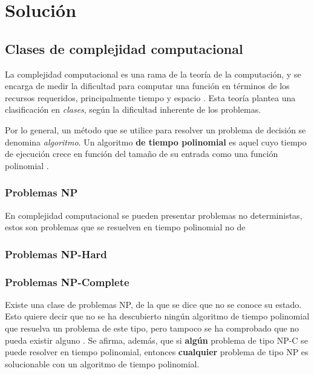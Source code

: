 \section{Solución}

\subsection{Clases de complejidad computacional}

La complejidad computacional es una rama de la teoría de la computación, y se encarga de medir la dificultad para computar una función en términos de los recursos requeridos, principalmente tiempo y espacio \cite{R3}. Esta teoría plantea una clasificación en \emph{clases}, según la dificultad inherente de los problemas.

Por lo general, un método que se utilice para resolver un problema de decisión se denomina \textit{algoritmo}. Un algoritmo \textbf{de tiempo polinomial} es aquel cuyo tiempo de ejecución crece en función del tamaño de su entrada como una función polinomial \cite{R4}.

\subsubsection{Problemas NP}

En complejidad computacional se pueden presentar problemas no deterministas, estos son problemas que se resuelven en tiempo polinomial no de

\subsubsection{Problemas NP-Hard}


\subsubsection{Problemas NP-Complete}

Existe una clase de problemas NP, de la que se dice que no se conoce su estado. Esto quiere decir que no se ha descubierto ningún algoritmo de tiempo polinomial que resuelva un problema de este tipo, pero tampoco se ha comprobado que no pueda existir alguno \cite{R5}. Se afirma, además, que si \textbf{algún} problema de tipo NP-C se puede resolver en tiempo polinomial, entonces \textbf{cualquier} problema de tipo NP es solucionable con un algoritmo de tiempo polinomial.

